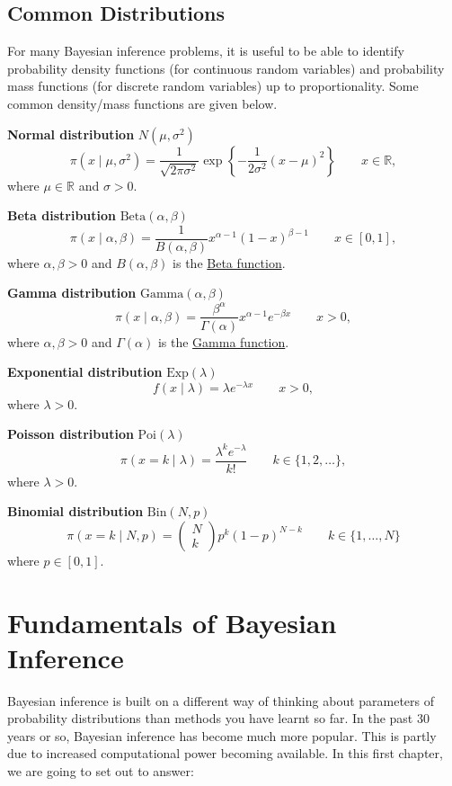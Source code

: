 \documentclass[
]{book}
\theoremstyle{definition}
\theoremstyle{definition}
\theoremstyle{definition}
\theoremstyle{definition}
\theoremstyle{remark}
\begin{document}
\section{Common Distributions}\label{common-distributions}

For many Bayesian inference problems, it is useful to be able to
identify probability density functions (for continuous random variables)
and probability mass functions (for discrete random variables) up to
proportionality. Some common density/mass functions are given below.

\textbf{Normal distribution} \(N(\mu,\sigma^2)\)
\[
\pi(x \mid \mu, \sigma^2) = \frac{1}{\sqrt{2\pi\sigma^2}}\exp\left\{-\frac{1}{2\sigma^2}(x-\mu)^2\right\} \qquad x \in\mathbb{R},
\] where \(\mu \in \mathbb{R}\) and \(\sigma > 0\).

\textbf{Beta distribution} \(\text{Beta}(\alpha,\beta)\)
\[
\pi(x\mid \alpha, \beta) = \frac{1}{B(\alpha, \beta)}x^{\alpha-1}(1-x)^{\beta - 1} \qquad  x \in [0, 1],
\] where \(\alpha, \beta > 0\) and \(B(\alpha, \beta)\) is the \href{https://en.wikipedia.org/wiki/Beta_function}{Beta
function}.

\textbf{Gamma distribution} \(\text{Gamma}(\alpha,\beta)\)
\[
\pi(x\mid \alpha, \beta) = \frac{\beta^\alpha}{\Gamma(\alpha)}x^{\alpha - 1}e^{-\beta x} \qquad  x > 0,
\] where \(\alpha, \beta > 0\) and \(\Gamma(\alpha)\) is the \href{https://en.wikipedia.org/wiki/Gamma_function}{Gamma
function}.

\textbf{Exponential distribution} \(\text{Exp}(\lambda)\)
\[
f(x \mid \lambda) = \lambda e^{-\lambda x} \qquad x > 0,
\] where \(\lambda > 0\).

\textbf{Poisson distribution} \(\text{Poi}(\lambda)\)
\[
\pi(x = k \mid \lambda) = \frac{\lambda^k e^{-\lambda}}{k!} \qquad k \in \{1, 2, \ldots\},
\] where \(\lambda > 0\).

\textbf{Binomial distribution} \(\text{Bin}(N,p)\)
\[
\pi(x = k \mid N, p) = \begin{pmatrix} N \\ k\end{pmatrix} p^k (1-p)^{N-k} \qquad k \in \{1, \ldots, N\}
\]
where \(p \in [0, 1]\).

\chapter{Fundamentals of Bayesian Inference}\label{fundamentals}

Bayesian inference is built on a different way of thinking about parameters of probability distributions than methods you have learnt so far. In the past 30 years or so, Bayesian inference has become much more popular. This is partly due to increased computational power becoming available. In this first chapter, we are going to set out to answer:
\end{document}
